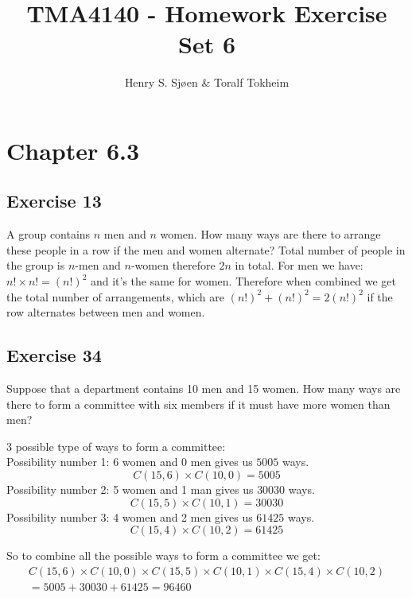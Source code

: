 \documentclass[12pt]{article}
\author{Henry S. Sjøen \& Toralf Tokheim}
\title{
  \textbf{TMA4140 - Homework Exercise Set 6}}
\begin{document}
    \maketitle
    \thispagestyle{empty}
    \pagebreak
    \tableofcontents
    \pagebreak


    \section{Chapter 6.3} 
    \subsection{Exercise 13}
    A group contains $n$ men and $n$ women. How many ways are there to arrange these people in a row if the men and women alternate?
    Total number of people in the group is $n$-men and $n$-women therefore $2n$ in total.
    For men we have: $n! \times n!=(n!)^2$ and it's the same for women.
    Therefore when combined we get the total number of arrangements, which are $(n!)^2+(n!)^2=2(n!)^2$ if the row alternates between men and women.

    \subsection{Exercise 34}
    Suppose that a department contains 10 men and 15 women. How many ways are there to form a committee with six members if it must have more women than men?

    3 possible type of ways to form a committee:\\
    Possibility number 1: 6 women and 0 men gives us $5005$ ways. 
    \begin{equation}
        C(15,6)\times C(10,0)=5005
    \end{equation}
    Possibility number 2: 5 women and 1 man gives us $30030$ ways.
    \begin{equation}
        C(15,5)\times C(10,1)=30030
    \end{equation}
    Possibility number 3: 4 women and 2 men gives us $61425$ ways.
    \begin{equation}
        C(15,4)\times C(10,2)=61425
    \end{equation}

    So to combine all the possible ways to form a committee we get:
\begin{equation}
    \begin{split}
        C(15,6)\times C(10,0)\times C(15,5)\times C(10,1)\times C(15,4)\times C(10,2)\\
        =5005+30030+61425=96460
    \end{split}
\end{equation}
\end{document}
